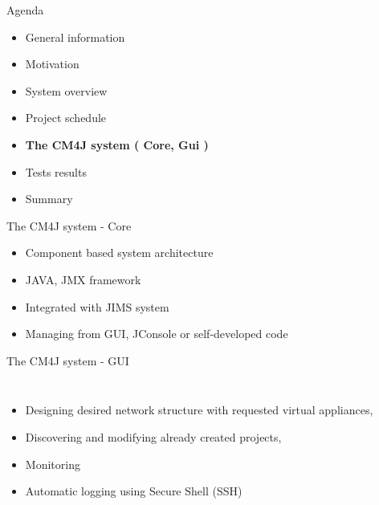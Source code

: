 \documentclass{beamer}
\begin{document}
	\begin{frame}{Agenda}

		\begin{itemize}
			\item General information
			\item Motivation
			\item System overview
			\item Project schedule
			\item \textbf{The CM4J system ( Core, Gui )}
			\item Tests results
			\item Summary
		\end{itemize}

	\end{frame}

	\begin{frame}{The CM4J system - Core}

		\begin{itemize}
			\item Component based system architecture
			\item JAVA, JMX framework
			\item Integrated with JIMS system
			\item Managing from GUI, JConsole or self-developed code
		\end{itemize}

	\end{frame}

	\begin{frame}{The CM4J system - GUI}

		\begin{columns}[c]
		\column{1.5in}
			\begin{itemize}
				\item Designing desired network structure with requested virtual appliances,
				\item Discovering and modifying already created projects,
				\item Monitoring
				\item Automatic logging using Secure Shell (SSH)
			\end{itemize}
		\column{1.8in}
		\end{columns}

	\end{frame}
\end{document}
